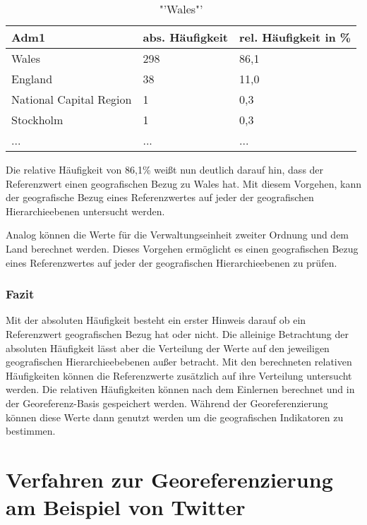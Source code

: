 			\begin{table}[h]
			\centering
			\caption{"'Wales"'}
			\label{tab:WalesVerw1}
			\begin{tabular}{|l|l|l|}
			\hline
			Adm1 & abs. Häufigkeit & rel. Häufigkeit in \% \\ \hline \hline
			Wales                   & 298 & 86,1 \\ \hline
			England                 & 38  & 11,0 \\ \hline
			National Capital Region & 1   & 0,3  \\ \hline
			Stockholm               & 1   & 0,3  \\ \hline
			... & ... & ... \\ \hline
			\end{tabular}
			\end{table}  

			Die relative Häufigkeit von 86,1\% weißt nun deutlich darauf hin, dass der Referenzwert einen geografischen Bezug zu Wales hat.
			Mit diesem Vorgehen, kann der geografische Bezug eines Referenzwertes auf jeder der geografischen Hierarchieebenen untersucht werden.

			Analog können die Werte für die Verwaltungseinheit zweiter Ordnung und dem Land berechnet werden.
			Dieses Vorgehen ermöglicht es einen geografischen Bezug eines Referenzwertes auf jeder der geografischen Hierarchieebenen zu prüfen.

		\subsubsection{Fazit}

			Mit der absoluten Häufigkeit besteht ein erster Hinweis darauf ob ein Referenzwert geografischen Bezug hat oder nicht.
			Die alleinige Betrachtung der absoluten Häufigkeit lässt aber die Verteilung der Werte auf den jeweiligen geografischen Hierarchieebebenen außer betracht.
			Mit den berechneten relativen Häufigkeiten können die Referenzwerte zusätzlich auf ihre Verteilung untersucht werden.
			Die relativen Häufigkeiten können nach dem Einlernen berechnet und in der Georeferenz-Basis gespeichert werden. 
			Während der Georeferenzierung können diese Werte dann genutzt werden um die geografischen Indikatoren zu bestimmen. 

	\section{Verfahren zur Georeferenzierung am Beispiel von Twitter}

